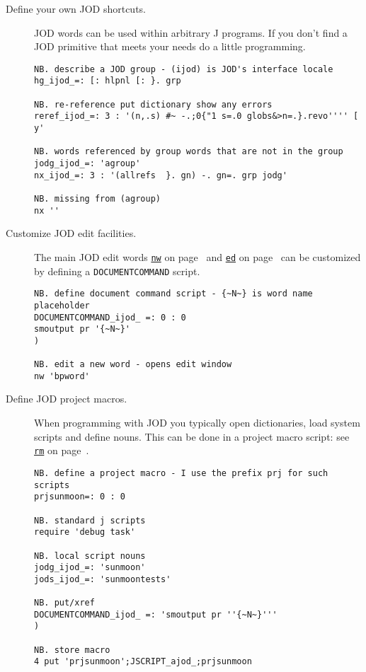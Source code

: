 \begin{description}
\item[Define your own JOD shortcuts.]  JOD words can be used 
within arbitrary J programs.  If you don't find a JOD primitive that meets 
your needs do a little programming.

\begin{lstlisting}[frame=single,framerule=0pt]
NB. describe a JOD group - (ijod) is JOD's interface locale
hg_ijod_=: [: hlpnl [: }. grp
   
NB. re-reference put dictionary show any errors
reref_ijod_=: 3 : '(n,.s) #~ -.;0{"1 s=.0 globs&>n=.}.revo'''' [ y'
   
NB. words referenced by group words that are not in the group
jodg_ijod_=: 'agroup'
nx_ijod_=: 3 : '(allrefs  }. gn) -. gn=. grp jodg'
   
NB. missing from (agroup)
nx ''
\end{lstlisting}
 

\item[Customize JOD edit facilities.]  The main JOD edit words \hyperlink{il:nw}{\texttt{nw}} on page~\pageref{ss:nw} and
 \hyperlink{il:ed}{\texttt{ed}} on page~\pageref{ss:ed} can be customized by defining a \texttt{DOCUMENTCOMMAND} script.

\begin{lstlisting}[frame=single,framerule=0pt]
NB. define document command script - {~N~} is word name placeholder
DOCUMENTCOMMAND_ijod_ =: 0 : 0
smoutput pr '{~N~}'
) 
   
NB. edit a new word - opens edit window
nw 'bpword'
\end{lstlisting}
 

\item[Define JOD project macros.]  When programming with JOD you typically 
open dictionaries, load system scripts and define nouns. This can be done in 
a project macro script: see \hyperlink{il:rm}{\texttt{rm}} on page~\pageref{ss:rm}.

\begin{lstlisting}[frame=single,framerule=0pt]
NB. define a project macro - I use the prefix prj for such scripts
prjsunmoon=: 0 : 0

NB. standard j scripts
require 'debug task'

NB. local script nouns 
jodg_ijod_=: 'sunmoon'
jods_ijod_=: 'sunmoontests'

NB. put/xref
DOCUMENTCOMMAND_ijod_ =: 'smoutput pr ''{~N~}'''
)
   
NB. store macro
4 put 'prjsunmoon';JSCRIPT_ajod_;prjsunmoon


\end{lstlisting}
\end{description}
